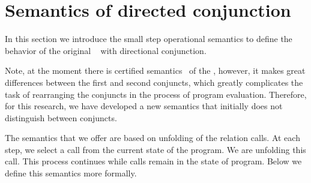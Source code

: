 \section{Semantics of directed conjunction}
In this section we introduce the small step operational semantics to define the behavior of the original \mk~ with directional conjunction. 


Note, at the moment there is certified semantics~\cite{fair:semantics} of the \mk, however, it makes great differences between the first and second conjuncts, which greatly complicates the task of rearranging the conjuncts in the process of program evaluation. 
Therefore, for this research, we have developed a new semantics that initially does not distinguish between conjuncts.


The semantics that we offer are based on unfolding of the relation calls.
At each step, we select a call from the current state of the program. 
We are unfolding this call.
This process continues while calls remain in the state of program. 
Below we define this semantics more formally.



